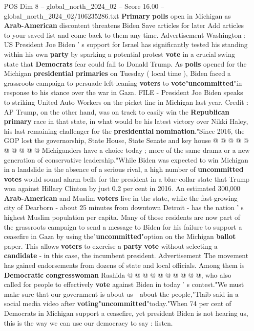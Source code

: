 \begin{textsample}{POS Dim 8 – global\_north\_2024\_02 – Score 16.00 – global\_north\_2024\_02/106235286.txt}  \label{ex:f8_pos_024}
\textbf{Primary} \textbf{polls} open in Michigan as \textbf{Arab-American} discontent threatens Biden Save articles for later Add articles to your saved list and come back to them any time.
Advertisement Washington : US President Joe Biden ' s support for Israel has significantly tested his standing within his own \textbf{party} by sparking a potential protest \textbf{vote} in a crucial swing state that \textbf{Democrats} fear could fall to Donald Trump.
As \textbf{polls} opened for the Michigan \textbf{presidential} \textbf{primaries} on Tuesday ( local time ), Biden faced a grassroots campaign to persuade left-leaning \textbf{voters} to \textbf{vote}"\textbf{uncommitted}"in response to his stance over the war in Gaza.
FILE - President Joe Biden speaks to striking United Auto Workers on the picket line in Michigan last year.
Credit : AP Trump, on the other hand, was on track to easily win the \textbf{Republican} \textbf{primary} race in that state, in what would be his latest victory over Nikki Haley, his last remaining challenger for the \textbf{presidential} \textbf{nomination}."Since 2016, the GOP lost the governorship, State House, State Senate and key house @ @ @ @ @ @ @ @ @ @ Michiganders have a choice today ; more of the same drama or a new generation of conservative leadership."While Biden was expected to win Michigan in a landslide in the absence of a serious rival, a high number of \textbf{uncommitted} \textbf{votes} would sound alarm bells for the president in a blue-collar state that Trump won against Hillary Clinton by just 0.2 per cent in 2016.
An estimated 300,000 \textbf{Arab-American} and Muslim \textbf{voters} live in the state, while the fast-growing city of Dearborn - about 25 minutes from downtown Detroit - has the nation ' s highest Muslim population per capita.
Many of those residents are now part of the grassroots campaign to send a message to Biden for his failure to support a ceasefire in Gaza by using the"\textbf{uncommitted}"option on the Michigan \textbf{ballot} paper.
This allows \textbf{voters} to exercise a \textbf{party} \textbf{vote} without selecting a \textbf{candidate} - in this case, the incumbent president.
Advertisement The movement has gained endorsements from dozens of state and local officials.
Among them is \textbf{Democratic} \textbf{congresswoman} Rashida @ @ @ @ @ @ @ @ @ @, who also called for people to effectively \textbf{vote} against Biden in today ' s contest."We must make sure that our government is about us - about the people,"Tlaib said in a social media video after \textbf{voting}"\textbf{uncommitted}"today."When 74 per cent of Democrats in Michigan support a ceasefire, yet president Biden is not hearing us, this is the way we can use our democracy to say : listen.

\end{textsample}
